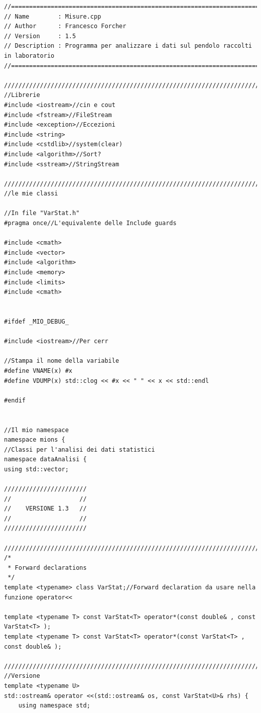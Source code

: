 \documentclass[12pt]{article} %
\begin{document}
	\begin{verbatim}
//============================================================================
// Name        : Misure.cpp
// Author      : Francesco Forcher
// Version     : 1.5
// Description : Programma per analizzare i dati sul pendolo raccolti in laboratorio
//============================================================================

/////////////////////////////////////////////////////////////////////////////////////
//Librerie
#include <iostream>//cin e cout
#include <fstream>//FileStream
#include <exception>//Eccezioni
#include <string>
#include <cstdlib>//system(clear)
#include <algorithm>//Sort?
#include <sstream>//StringStream

/////////////////////////////////////////////////////////////////////////////////////
//le mie classi

//In file "VarStat.h"
#pragma once//L'equivalente delle Include guards

#include <cmath>
#include <vector>
#include <algorithm>
#include <memory>
#include <limits>
#include <cmath>


#ifdef _MIO_DEBUG_

#include <iostream>//Per cerr

//Stampa il nome della variabile
#define VNAME(x) #x
#define VDUMP(x) std::clog << #x << " " << x << std::endl

#endif


//Il mio namespace
namespace mions {
//Classi per l'analisi dei dati statistici
namespace dataAnalisi {
using std::vector;

///////////////////////
//					 //
//	  VERSIONE 1.3	 //
//					 //
///////////////////////

///////////////////////////////////////////////////////////////////////////////////////////////////
/*
 * Forward declarations
 */
template <typename> class VarStat;//Forward declaration da usare nella funzione operator<<

template <typename T> const VarStat<T> operator*(const double& , const VarStat<T> );
template <typename T> const VarStat<T> operator*(const VarStat<T> , const double& );

///////////////////////////////////////////////////////////////////////////////////////////////////
//Versione
template <typename U>
std::ostream& operator <<(std::ostream& os, const VarStat<U>& rhs) {
	using namespace std;


\end{verbatim}
\end{document}
